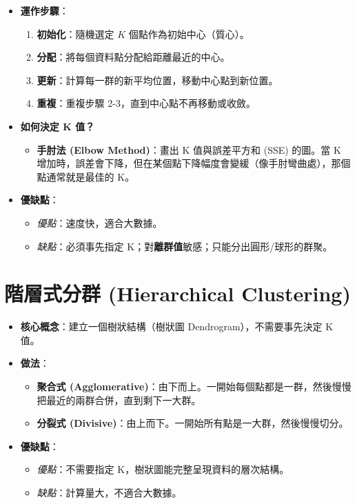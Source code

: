 \documentclass[
  letterpaper,
  DIV=11,
  numbers=noendperiod]{scrreprt}
\providecommand{\tightlist}{%
  \setlength{\itemsep}{0pt}\setlength{\parskip}{0pt}}
\begin{document}
\begin{itemize}
\tightlist
\item
  \textbf{運作步驟}：

  \begin{enumerate}
  \def\labelenumi{\arabic{enumi}.}
  \tightlist
  \item
    \textbf{初始化}：隨機選定 \(K\) 個點作為初始中心（質心）。
  \item
    \textbf{分配}：將每個資料點分配給距離最近的中心。
  \item
    \textbf{更新}：計算每一群的新平均位置，移動中心點到新位置。
  \item
    \textbf{重複}：重複步驟 2-3，直到中心點不再移動或收斂。
  \end{enumerate}
\item
  \textbf{如何決定 K 值？}

  \begin{itemize}
  \tightlist
  \item
    \textbf{手肘法 (Elbow Method)}：畫出 K 值與誤差平方和 (SSE) 的圖。當
    K
    增加時，誤差會下降，但在某個點下降幅度會變緩（像手肘彎曲處），那個點通常就是最佳的
    K。
  \end{itemize}
\item
  \textbf{優缺點}：

  \begin{itemize}
  \tightlist
  \item
    \emph{優點}：速度快，適合大數據。
  \item
    \emph{缺點}：必須事先指定
    K；對\textbf{離群值}敏感；只能分出圓形/球形的群聚。
  \end{itemize}
\end{itemize}

\section{階層式分群 (Hierarchical
Clustering)}\label{sec-hierarchical-clustering}

\begin{itemize}
\tightlist
\item
  \textbf{核心概念}：建立一個樹狀結構（樹狀圖
  Dendrogram），不需要事先決定 K 值。
\item
  \textbf{做法}：

  \begin{itemize}
  \tightlist
  \item
    \textbf{聚合式
    (Agglomerative)}：由下而上。一開始每個點都是一群，然後慢慢把最近的兩群合併，直到剩下一大群。
  \item
    \textbf{分裂式
    (Divisive)}：由上而下。一開始所有點是一大群，然後慢慢切分。
  \end{itemize}
\item
  \textbf{優缺點}：

  \begin{itemize}
  \tightlist
  \item
    \emph{優點}：不需要指定 K，樹狀圖能完整呈現資料的層次結構。
  \item
    \emph{缺點}：計算量大，不適合大數據。
  \end{itemize}
\end{itemize}
\end{document}
